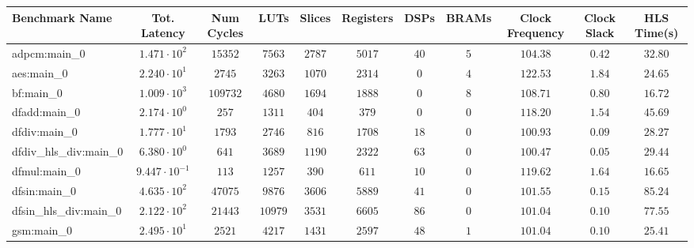 \begin{tabular}{|l|c|c|c|c|c|c|c|c|c|c|}
\hline
Benchmark Name          & Tot. Latency            & Num Cycles & LUTs      & Slices    & Registers & DSPs    & BRAMs  & Clock Frequency & Clock Slack & HLS Time(s) \\
\hline
adpcm:main\_0           & $ 1.471 \cdot 10^{2}  $ & $ 15352  $ & $ 7563  $ & $ 2787  $ & $ 5017  $ & $ 40  $ & $ 5  $ & $ 104.38      $ & $ 0.42    $ & $ 32.80   $ \\
aes:main\_0             & $ 2.240 \cdot 10^{1}  $ & $ 2745   $ & $ 3263  $ & $ 1070  $ & $ 2314  $ & $ 0   $ & $ 4  $ & $ 122.53      $ & $ 1.84    $ & $ 24.65   $ \\
bf:main\_0              & $ 1.009 \cdot 10^{3}  $ & $ 109732 $ & $ 4680  $ & $ 1694  $ & $ 1888  $ & $ 0   $ & $ 8  $ & $ 108.71      $ & $ 0.80    $ & $ 16.72   $ \\
dfadd:main\_0           & $ 2.174 \cdot 10^{0}  $ & $ 257    $ & $ 1311  $ & $ 404   $ & $ 379   $ & $ 0   $ & $ 0  $ & $ 118.20      $ & $ 1.54    $ & $ 45.69   $ \\
dfdiv:main\_0           & $ 1.777 \cdot 10^{1}  $ & $ 1793   $ & $ 2746  $ & $ 816   $ & $ 1708  $ & $ 18  $ & $ 0  $ & $ 100.93      $ & $ 0.09    $ & $ 28.27   $ \\
dfdiv\_hls\_div:main\_0 & $ 6.380 \cdot 10^{0}  $ & $ 641    $ & $ 3689  $ & $ 1190  $ & $ 2322  $ & $ 63  $ & $ 0  $ & $ 100.47      $ & $ 0.05    $ & $ 29.44   $ \\
dfmul:main\_0           & $ 9.447 \cdot 10^{-1} $ & $ 113    $ & $ 1257  $ & $ 390   $ & $ 611   $ & $ 10  $ & $ 0  $ & $ 119.62      $ & $ 1.64    $ & $ 16.65   $ \\
dfsin:main\_0           & $ 4.635 \cdot 10^{2}  $ & $ 47075  $ & $ 9876  $ & $ 3606  $ & $ 5889  $ & $ 41  $ & $ 0  $ & $ 101.55      $ & $ 0.15    $ & $ 85.24   $ \\
dfsin\_hls\_div:main\_0 & $ 2.122 \cdot 10^{2}  $ & $ 21443  $ & $ 10979 $ & $ 3531  $ & $ 6605  $ & $ 86  $ & $ 0  $ & $ 101.04      $ & $ 0.10    $ & $ 77.55   $ \\
gsm:main\_0             & $ 2.495 \cdot 10^{1}  $ & $ 2521   $ & $ 4217  $ & $ 1431  $ & $ 2597  $ & $ 48  $ & $ 1  $ & $ 101.04      $ & $ 0.10    $ & $ 25.41   $ \\

\end{tabular}
